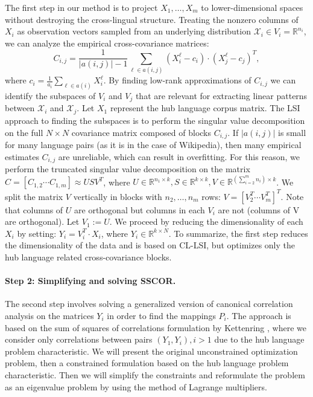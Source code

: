 \documentclass[twoside,11pt]{article}
\newcommand{\RR}{\mathbb{R}}
\begin{document}
The first step in our method is to project $X_1, \ldots, X_m$ to lower-dimensional spaces without destroying the cross-lingual structure. Treating the nonzero columns of $X_i$ as observation vectors sampled from an underlying distribution $\mathcal{X}_i \in V_i = \RR^{n_i}$, we can analyze the empirical cross-covariance matrices:
$$C_{i,j} = \frac{1}{|a(i,j)|-1 }\sum_{\ell \in a(i,j)} (X_i^{\ell} - c_i)\cdot (X_j^{\ell} - c_j)^T,$$
 where $c_i = \frac{1}{a_i} \sum_{\ell \in a(i)}X_i^{\ell}$. By finding low-rank approximations of $C_{i,j}$ we can identify the subspaces of $V_i$ and $V_j$ that are relevant for extracting linear patterns between $\mathcal{X}_i$ and $\mathcal{X}_j$. Let $X_1$ represent the hub language corpus matrix. The LSI approach to finding the subspaces is to perform the singular value decomposition on the full $N \times N$ covariance matrix composed of blocks $C_{i,j}$. If $|a(i,j)|$ is small for many language pairs (as it is in the case of Wikipedia), then many empirical estimates $C_{i,j}$ are unreliable, which can result in overfitting. For this reason, we perform the truncated singular value decomposition on the matrix $C = [C_{1,2}  \cdots  C_{1,m}] \approx U S V^T$, where $U \in \RR^{n_1 \times k}, S \in \RR^{k \times k}, V \in \RR^{(\sum_{i=2}^m n_i) \times k}$. We split the matrix $V$ vertically in blocks with $n_2, \ldots, n_m$ rows: $V = [V_2^T  \cdots  V_m^T]^T$. Note that columns of $U$ are orthogonal but columns in each $V_i$ are not (columns of V are orthogonal). Let $V_1 := U$. We proceed by reducing the dimensionality of each $X_i$ by setting: $Y_i = V_i^T \cdot X_i$, where $Y_i \in \RR^{k\times N}$. To summarize, the first step reduces the dimensionality of the data and is based on CL-LSI, but optimizes only the hub language related cross-covariance blocks.

\paragraph{Step 2: Simplifying and solving SSCOR.}
The second step involves solving a generalized version of canonical correlation analysis on the matrices $Y_i$ in order to find the mappings $P_i$. The approach is based on the sum of squares of correlations formulation by Kettenring \cite{Kettenring}, where we consider only correlations between pairs $(Y_1, Y_i), i >1$ due to the hub language problem characteristic.
We will present the original unconstrained optimization problem, then a constrained formulation based on the hub language problem characteristic. Then we will simplify the constraints and reformulate
the problem as an eigenvalue problem by using the method of Lagrange multipliers.
\end{document}

